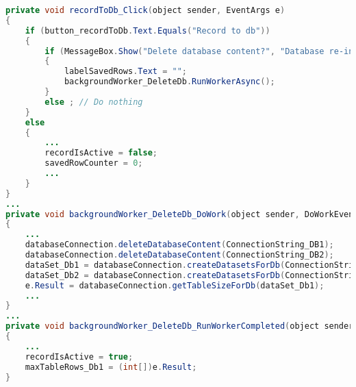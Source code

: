 \label{lst:recordToDb}
\begin{lstlisting}[language=Java, caption=Messwertaufnahme starten]
private void recordToDb_Click(object sender, EventArgs e)
{
	if (button_recordToDb.Text.Equals("Record to db"))
	{
		if (MessageBox.Show("Delete database content?", "Database re-initialization", MessageBoxButtons.OKCancel, MessageBoxIcon.Question) == DialogResult.OK)
		{
			labelSavedRows.Text = "";
			backgroundWorker_DeleteDb.RunWorkerAsync();
		}
		else ; // Do nothing
	}
	else
	{
		...
		recordIsActive = false;
		savedRowCounter = 0;
		...
	}
}
...
private void backgroundWorker_DeleteDb_DoWork(object sender, DoWorkEventArgs e)
{
	...
	databaseConnection.deleteDatabaseContent(ConnectionString_DB1);
	databaseConnection.deleteDatabaseContent(ConnectionString_DB2);
	dataSet_Db1 = databaseConnection.createDatasetsForDb(ConnectionString_DB1);
	dataSet_Db2 = databaseConnection.createDatasetsForDb(ConnectionString_DB2);
	e.Result = databaseConnection.getTableSizeForDb(dataSet_Db1);
	...
}
...
private void backgroundWorker_DeleteDb_RunWorkerCompleted(object sender, RunWorkerCompletedEventArgs e)
{
	...
	recordIsActive = true;
	maxTableRows_Db1 = (int[])e.Result;
}
\end{lstlisting}